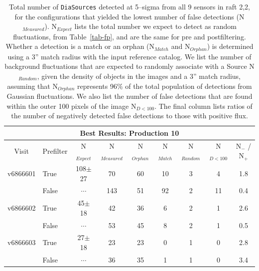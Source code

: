 \documentclass[prd, nofootinbib, floatfix, 11pt,tightenlines,times]{article}
\begin{document}
{\begin{table}
\centering
\begin{tabular}{clc|cccccc}
\hline
\multicolumn{9}{|c|}{Best Results: Production 10} \\
\hline
Visit    & Prefilter & N$_{Expect}$ & N$_{Measured}$ &  N$_{Orphan}$ & N$_{Match}$ & N$_{Random}$ & N$_{D<100}$ & N$_{-}$ / N$_{+}$ \\
\hline
v6866601 & True      & 108$\pm$27   & 70      &60         & 10 & 3     & 4   & 1.8 \\ 
         & False     & $\cdots$     & 143     &51         & 92 & 2     & 11  & 0.4 \\
v6866602 & True      & 45$\pm$18    & 42      &36         & 6  & 2     & 1   & 2.6 \\
         & False     & $\cdots$     & 53      &45         & 8  & 2     & 1   & 0.5 \\
v6866603 & True      & 27$\pm$18    & 23      &23         & 0  & 1     & 0   & 2.8 \\
         & False     & $\cdots$     & 36      &35         & 1  & 1     & 0   & 3.4 \\
\end{tabular}
\caption{Total number of {\tt DiaSources} detected at 5--sigma from
  all 9 sensors in raft 2,2, for the configurations that yielded the
  lowest number of false detections (N$_{Measured}$).  N$_{Expect}$
  lists the total number we expect to detect as random fluctuations,
  from Table~\ref{tab-fp}, and are the same for pre and postfiltering.
  Whether a detection is a match or an orphan (N$_{Match}$ and
  N$_{Orphan}$) is determined using a 3'' match radius with the input
  reference catalog.  We list the number of background fluctuations
  that are expected to randomly associate with a Source N$_{Random}$,
  given the density of objects in the images and a 3'' match radius,
  assuming that N$_{Orphan}$ represents 96\% of the total population
  of detections from Gaussian fluctuations.  We also list the number
  of false detections that are found within the outer 100 pixels of
  the image N$_{D<100}$.  The final column lists ratios of the number
  of negatively detected false detections to those with positive
  flux. \label{tab-bestfp10}}
\end{table}


}
\end{document}
